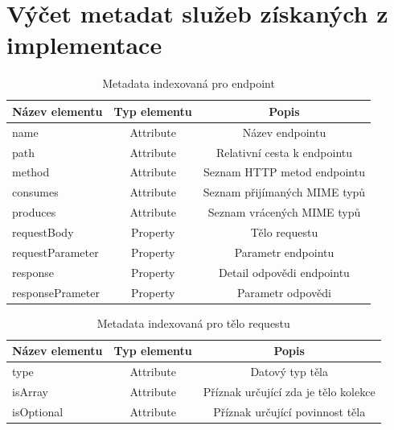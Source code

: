 \documentclass[czech,DP]{thesiskiv}
\begin{document}
\chapter{Výčet metadat služeb získaných z implementace}
\begin{table}[h]
	\centering
	\begin{tabular}{|l|c|c|}
		\hline
		Název elementu & Typ elementu & Popis \\ 
		\hline
		\hline
		name & Attribute & Název endpointu \\
		\hline
		path & Attribute & Relativní cesta k endpointu \\
		\hline
		method & Attribute & Seznam HTTP metod endpointu \\
		\hline
		consumes & Attribute & Seznam přijímaných MIME typů \\
		\hline
		produces & Attribute & Seznam vrácených MIME typů \\
		\hline
		requestBody & Property & Tělo requestu \\
		\hline
		requestParameter & Property & Parametr endpointu \\
		\hline
		response & Property & Detail odpovědi endpointu \\
		\hline
		responsePrameter & Property & Parametr odpovědi \\
		\hline
	\end{tabular}
	\caption{Metadata indexovaná pro endpoint}
\end{table}

\begin{table}[h]
	\centering
	\begin{tabular}{|l|c|c|}
		\hline
		Název elementu & Typ elementu & Popis \\ 
		\hline
		\hline
		type & Attribute & Datový typ těla \\
		\hline
		isArray & Attribute & Příznak určující zda je tělo kolekce \\
		\hline
		isOptional & Attribute & Příznak určující povinnost těla \\
		\hline
	\end{tabular}
	\caption{Metadata indexovaná pro tělo requestu}
\end{table}
\end{document}
